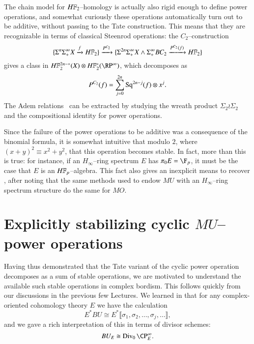 \begin{example}
The chain model for $\HFtwo$--homology is actually also rigid enough to define power operations, and somewhat curiously these operations automatically turn out to be additive, without passing to the Tate construction.  This means that they are recognizable in terms of classical Steenrod operations: the $C_2$--construction \[\{\Susp^n \Susp^\infty_+ X \xrightarrow{f} \HFtwo\} \xrightarrow{P^{C_2}} \{\Susp^{2n} \Susp^\infty_+ X \sm \Susp^\infty_+ BC_2 \xrightarrow{P^{C_2}(f)} \HFtwo\}\] gives a class in $\HFtwo^{2n-*}(X) \otimes \HFtwo^*(\RP^\infty)$, which decomposes as \[P^{C_2}(f) = \sum_{j=0}^{2n} \operatorname{Sq}^{2n-j}(f) \otimes x^j.\]  The Adem relations~\cite{Adem} can be extracted by studying the wreath product $\Sigma_2 \wr \Sigma_2$ and the compositional identity for power operations.
\end{example}

\begin{remark}\label{HinftyRingsModp}
Since the failure of the power operations to be additive was a consequence of the binomial formula, it is somewhat intuitive that modulo $2$, where $(x + y)^2 \equiv x^2 + y^2$, that this operation becomes stable.  In fact, more than this is true: for instance, if an $H_\infty$--ring spectrum $E$ has $\pi_0 E = \F_p$, it must be the case that $E$ is an $\HFp$--algebra.  This fact also gives an inexplicit means to recover , after noting that the same methods used to endow $MU$ with an $H_\infty$--ring spectrum structure do the same for $MO$.
\end{remark}















\section{Explicitly stabilizing cyclic \texorpdfstring{$MU$}{MU}--power operations}\label{StabilizingTheMUSteenrodOps}

Having thus demonstrated that the Tate variant of the cyclic power operation decomposes as a sum of stable operations, we are motivated to understand the available such stable operations in complex bordism.  This follows quickly from our discussions in the previous few Lectures.  We learned in  that for any complex-oriented cohomology theory $E$ we have the calculation \[E^* BU \cong E^*\llbracket \sigma_1, \sigma_2, \ldots, \sigma_j, \ldots\rrbracket,\] and we gave a rich interpretation of this in terms of divisor schemes: \[BU_E \cong \Div_0 \CP^\infty_E.\]

